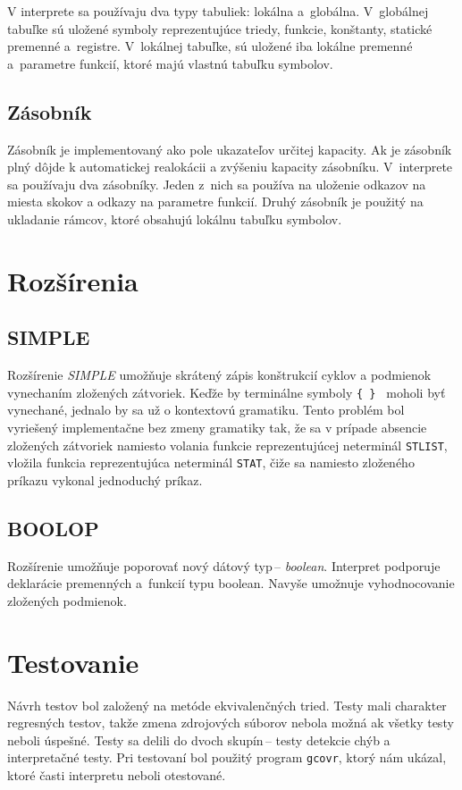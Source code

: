 \documentclass[11pt,a4paper]{article}
\begin{document}
        V interprete sa používaju dva typy tabuliek: lokálna a~globálna. V~globálnej tabuľke sú uložené symboly reprezentujúce
        triedy, funkcie, konštanty, statické premenné a~registre. V~lokálnej tabuľke, sú uložené iba lokálne premenné a~parametre
        funkcií, ktoré majú vlastnú tabuľku symbolov.

        \subsection{Zásobník}
        Zásobník je implementovaný ako pole ukazateľov určitej kapacity. Ak je zásobník plný dôjde k automatickej realokácii a zvýšeniu kapacity zásobníku. V~interprete sa používaju dva zásobníky. Jeden z~nich sa používa na uloženie odkazov na miesta skokov a odkazy na parametre funkcií. Druhý zásobník je použitý na ukladanie rámcov, ktoré obsahujú lokálnu tabuľku symbolov.

\section{Rozšírenia} 
\label{rozsirenia}

    \subsection{SIMPLE}
    Rozšírenie \emph{SIMPLE} umožňuje skrátený zápis konštrukcií cyklov a podmienok vynechaním zložených zátvoriek. Keďže by terminálne symboly
    \texttt{\{ \} } moholi byť vynechané, jednalo by sa už o kontextovú gramatiku. Tento problém bol vyriešený implementačne bez zmeny
    gramatiky tak, že sa v prípade absencie zložených zátvoriek namiesto volania funkcie reprezentujúcej neterminál \texttt{STLIST}, vložila
    funkcia reprezentujúca neterminál \texttt{STAT}, čiže sa namiesto zloženého príkazu vykonal jednoduchý príkaz.

    \subsection{BOOLOP}
    Rozšírenie umožňuje poporovať nový dátový typ\,-- \emph{boolean}. Interpret podporuje deklarácie premenných a~funkcií typu boolean. Navyše
    umožnuje vyhodnocovanie zložených podmienok.

\section{Testovanie} 
\label{testovanie}
Návrh testov bol založený na metóde ekvivalenčných tried. Testy mali charakter regresných testov, takže zmena zdrojových súborov nebola možná ak
všetky testy neboli úspešné. Testy sa delili do dvoch skupín\,-- testy detekcie chýb a interpretačné testy. Pri testovaní bol použitý program
\texttt{gcovr}, ktorý nám ukázal, ktoré časti interpretu neboli otestované.
\end{document}
